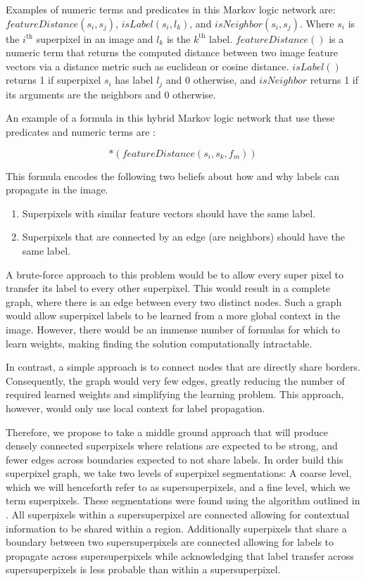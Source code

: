 \documentclass{article} %
\begin{document}
Examples of numeric terms and predicates in this Markov logic network are: $featureDistance(s_i,s_j)$, $isLabel(s_i,l_k)$, and $isNeighbor(s_i,s_j)$. Where $s_i$ is the $i^\textrm{th}$ superpixel in an image and $l_k$ is the $k^\textrm{th}$ label. $featureDistance()$ is a numeric term that returns the computed distance between two image feature vectors via a distance metric such as euclidean or cosine distance. $isLabel()$ returns 1 if superpixel $s_i$ has label $l_j$ and 0 otherwise, and $isNeighbor$ returns 1 if its arguments are the neighbors and 0 otherwise. 

An example of a formula in this hybrid Markov logic network that use these predicates and numeric terms are :

\begin{equation*}
	[isNeighbor(s_i,s_j) \Rightarrow (isLabel(s_i,l_k) \Leftrightarrow isLabel(s_k,l_m))]*(featureDistance(s_i, s_k, f_m))
\end{equation*}

This formula encodes the following two beliefs about how and why labels can propagate in the image.

\begin{enumerate}
\item
	Superpixels with similar feature vectors should have the same label.
\item
	Superpixels that are connected by an edge (are neighbors) should have the same label.
\end{enumerate}

A brute-force approach to this problem would be to allow every super pixel to transfer its label to every other superpixel. This would result in a complete graph, where there is an edge between every two distinct nodes. Such a graph would allow superpixel labels to be learned from a more global context in the image. However, there would be an immense number of formulas for which to learn weights, making finding the solution computationally intractable. 

In contrast, a simple approach is to connect nodes that are directly share borders. Consequently, the graph would very few edges, greatly reducing the number of required learned weights and simplifying the learning problem. This approach, however, would only use local context for label propagation.

Therefore, we propose to take a middle ground approach that will produce densely connected superpixels where relations are expected to be strong, and fewer edges across boundaries expected to not share labels. In order build this superpixel graph, we take two levels of superpixel segmentations: A coarse level, which we will henceforth refer to as supersuperpixels, and a fine level, which we term superpixels. These segmentations were found using the algorithm outlined in \cite{Superpixel}. All superpixels within a supersuperpixel are connected allowing for contextual information to be shared within a region. Additionally superpixels that share a boundary between two supersuperpixels are connected allowing for labels to propagate across supersuperpixels while acknowledging that label transfer across supersuperpixels is less probable than within a supersuperpixel.
\end{document}
